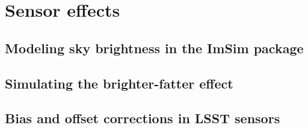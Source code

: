 \chapter{Sensor effects}

\section{Modeling sky brightness in the ImSim package}
\section{Simulating the brighter-fatter effect}
\section{Bias and offset corrections in LSST sensors}




